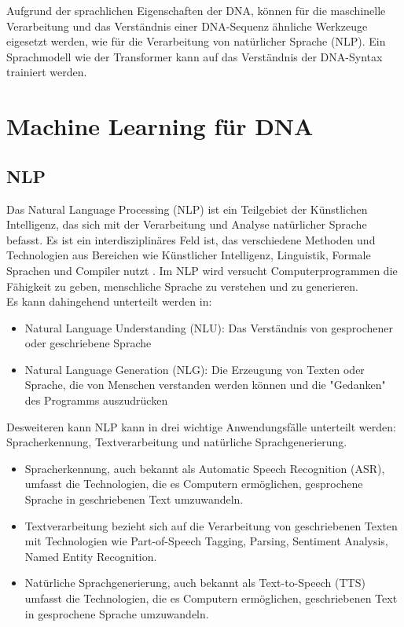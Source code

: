 \documentclass[oneside,bibliography=totocnumbered,BCOR=5mm]{scrbook}%
\theoremstyle{definition}
\theoremstyle{definition}
\theoremstyle{definition}
\theoremstyle{definition}
\theoremstyle{definition}
\theoremstyle{definition}
\begin{document}
Aufgrund der sprachlichen Eigenschaften der DNA, können für die maschinelle Verarbeitung und das Verständnis
einer DNA-Sequenz ähnliche Werkzeuge eigesetzt werden, wie für die Verarbeitung von natürlicher Sprache (NLP).
Ein Sprachmodell wie der Transformer kann auf das Verständnis der DNA-Syntax trainiert werden. \\
\linebreak[4]


\section{Machine Learning für DNA}


\subsection{NLP}

Das Natural Language Processing (NLP) ist ein Teilgebiet der Künstlichen Intelligenz, 
das sich mit der Verarbeitung und Analyse natürlicher Sprache befasst. 
Es ist ein interdisziplinäres Feld ist, das verschiedene Methoden und Technologien aus Bereichen wie Künstlicher Intelligenz, 
Linguistik, Formale Sprachen und Compiler nutzt \autocite{NLPfundamentals}.
Im NLP wird versucht Computerprogrammen die Fähigkeit zu geben, menschliche Sprache zu verstehen und zu generieren.  \\

Es kann dahingehend unterteilt werden in:
\begin{itemize}
  \item Natural Language Understanding (NLU): Das Verständnis von gesprochener oder geschriebene Sprache \autocite{NLPfundamentals}
  \item Natural Language Generation (NLG): Die Erzeugung von Texten oder Sprache, die von Menschen verstanden werden können
  und die "Gedanken" des Programms auszudrücken \autocite{NLPfundamentals}
\end{itemize}  


Desweiteren kann NLP kann in drei wichtige Anwendungsfälle unterteilt werden: Spracherkennung, Textverarbeitung und natürliche Sprachgenerierung. \\

\begin{itemize}
  \item  Spracherkennung, auch bekannt als Automatic Speech Recognition (ASR), umfasst die Technologien, 
  die es Computern ermöglichen, gesprochene Sprache in geschriebenen Text umzuwandeln.


  \item Textverarbeitung bezieht sich auf die Verarbeitung von geschriebenen Texten mit Technologien wie Part-of-Speech Tagging, 
  Parsing, Sentiment Analysis, Named Entity Recognition.


  \item Natürliche Sprachgenerierung, auch bekannt als Text-to-Speech (TTS) umfasst die Technologien, 
  die es Computern ermöglichen, geschriebenen Text in gesprochene Sprache umzuwandeln.
\end{itemize}  
\end{document}
